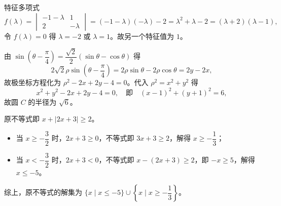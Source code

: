 \begin{answer}
特征多项式
\nopagebreak[4]
\[
f(\lambda)=\begin{vmatrix}-1-\lambda&1\\2&-\lambda\end{vmatrix}=(-1-\lambda)(-\lambda)-2=\lambda^{2}+\lambda-2=(\lambda+2)(\lambda-1),
\]
令 \(f(\lambda)=0\) 得 \(\lambda=-2\) 或 \(\lambda=1\)。故另一个特征值为 \(1\)。


由 \(\sin\left(\theta-\dfrac{\pi}{4}\right)=\dfrac{\sqrt{2}}{2}(\sin\theta-\cos\theta)\) 得
\nopagebreak[4]
\[
2\sqrt{2}\rho\sin\left(\theta-\frac{\pi}{4}\right)=2\rho\sin\theta-2\rho\cos\theta=2y-2x,
\]
故极坐标方程化为 \(\rho^{2}-2x+2y-4=0\)。代入 \(\rho^{2}=x^{2}+y^{2}\) 得
\nopagebreak[4]
\[
x^{2}+y^{2}-2x+2y-4=0,\quad\text{即}\quad(x-1)^{2}+(y+1)^{2}=6,
\]
故圆 \(C\) 的半径为 \(\sqrt{6}\)。


原不等式即 \(x+|2x+3|\geqslant2\)。

\begin{itemize}
\item 当 \(x\geqslant-\dfrac{3}{2}\) 时，\(2x+3\geqslant0\)，不等式即 \(3x+3\geqslant2\)，解得 \(x\geqslant-\dfrac{1}{3}\)；
\item 当 \(x<-\dfrac{3}{2}\) 时，\(2x+3<0\)，不等式即 \(x-(2x+3)\geqslant2\)，即 \(-x\geqslant5\)，解得 \(x\leqslant-5\)。
\end{itemize}

综上，原不等式的解集为 \(\{x\mid x\leqslant-5\}\cup\left\{x\mid x\geqslant-\dfrac{1}{3}\right\}\)。


\end{answer}
